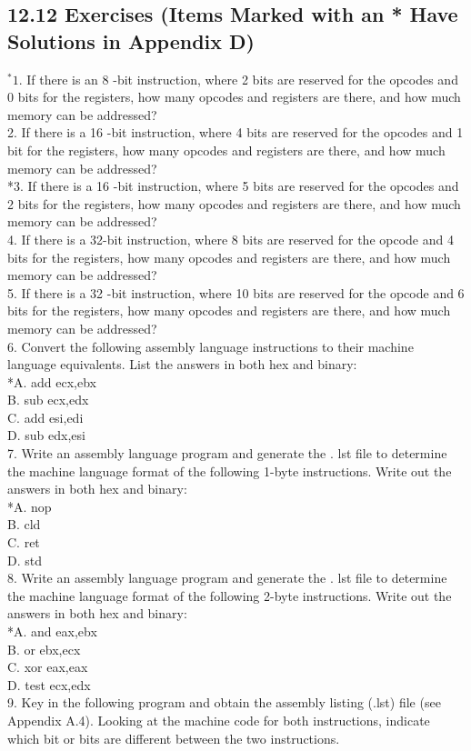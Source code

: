 \documentclass[10pt]{article}
\begin{document}
\subsection*{12.12 Exercises (Items Marked with an * Have Solutions in Appendix D)}
${ }^{*} 1$. If there is an 8 -bit instruction, where 2 bits are reserved for the opcodes and 0 bits for the registers, how many opcodes and registers are there, and how much memory can be addressed?\\
2. If there is a 16 -bit instruction, where 4 bits are reserved for the opcodes and 1 bit for the registers, how many opcodes and registers are there, and how much memory can be addressed?\\
*3. If there is a 16 -bit instruction, where 5 bits are reserved for the opcodes and 2 bits for the registers, how many opcodes and registers are there, and how much memory can be addressed?\\
4. If there is a 32-bit instruction, where 8 bits are reserved for the opcode and 4 bits for the registers, how many opcodes and registers are there, and how much memory can be addressed?\\
5. If there is a 32 -bit instruction, where 10 bits are reserved for the opcode and 6 bits for the registers, how many opcodes and registers are there, and how much memory can be addressed?\\
6. Convert the following assembly language instructions to their machine language equivalents. List the answers in both hex and binary:\\
*A. add ecx,ebx\\
B. sub ecx,edx\\
C. add esi,edi\\
D. sub edx,esi\\
7. Write an assembly language program and generate the . lst file to determine the machine language format of the following 1-byte instructions. Write out the answers in both hex and binary:\\
*A. nop\\
B. cld\\
C. ret\\
D. std\\
8. Write an assembly language program and generate the . lst file to determine the machine language format of the following 2-byte instructions. Write out the answers in both hex and binary:\\
*A. and eax,ebx\\
B. or ebx,ecx\\
C. xor eax,eax\\
D. test ecx,edx\\
9. Key in the following program and obtain the assembly listing (.lst) file (see Appendix A.4). Looking at the machine code for both instructions, indicate which bit or bits are different between the two instructions.
\end{document}
